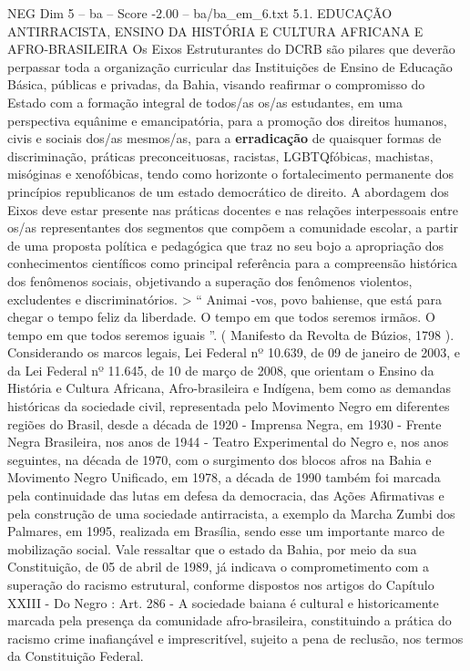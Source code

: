 \begin{textsample}{NEG Dim 5 – ba – Score -2.00 – ba/ba\_em\_6.txt}  \label{ex:f5_neg_011}
5.1.
EDUCAÇÃO ANTIRRACISTA, ENSINO DA HISTÓRIA E CULTURA AFRICANA E AFRO-BRASILEIRA Os Eixos Estruturantes do DCRB são pilares que deverão perpassar toda a organização curricular das Instituições de Ensino de Educação Básica, públicas e privadas, da Bahia, visando reafirmar o compromisso do Estado com a formação integral de todos/as os/as estudantes, em uma perspectiva equânime e emancipatória, para a promoção dos direitos humanos, civis e sociais dos/as mesmos/as, para a \textbf{erradicação} de quaisquer formas de discriminação, práticas preconceituosas, racistas, LGBTQfóbicas, machistas, misóginas e xenofóbicas, tendo como horizonte o fortalecimento permanente dos princípios republicanos de um estado democrático de direito.
A abordagem dos Eixos deve estar presente nas práticas docentes e nas relações interpessoais entre os/as representantes dos segmentos que compõem a comunidade escolar, a partir de uma proposta política e pedagógica que traz no seu bojo a apropriação dos conhecimentos científicos como principal referência para a compreensão histórica dos fenômenos sociais, objetivando a superação dos fenômenos violentos, excludentes e discriminatórios. > “ Animai -vos, povo bahiense, que está para chegar o tempo feliz da liberdade.
O tempo em que todos seremos irmãos.
O tempo em que todos seremos iguais ”. ( Manifesto da Revolta de Búzios, 1798 ).
Considerando os marcos legais, Lei Federal nº 10.639, de 09 de janeiro de 2003, e da Lei Federal nº 11.645, de 10 de março de 2008, que orientam o Ensino da História e Cultura Africana, Afro-brasileira e Indígena, bem como as demandas históricas da sociedade civil, representada pelo Movimento Negro em diferentes regiões do Brasil, desde a década de 1920 - Imprensa Negra, em 1930 - Frente Negra Brasileira, nos anos de 1944 - Teatro Experimental do Negro e, nos anos seguintes, na década de 1970, com o surgimento dos blocos afros na Bahia e Movimento Negro Unificado, em 1978, a década de 1990 também foi marcada pela continuidade das lutas em defesa da democracia, das Ações Afirmativas e pela construção de uma sociedade antirracista, a exemplo da Marcha Zumbi dos Palmares, em 1995, realizada em Brasília, sendo esse um importante marco de mobilização social.
Vale ressaltar que o estado da Bahia, por meio da sua Constituição, de 05 de abril de 1989, já indicava o comprometimento com a superação do racismo estrutural, conforme dispostos nos artigos do Capítulo XXIII - Do Negro : Art. 286 - A sociedade baiana é cultural e historicamente marcada pela presença da comunidade afro-brasileira, constituindo a prática do racismo crime inafiançável e imprescritível, sujeito a pena de reclusão, nos termos da Constituição Federal.

\end{textsample}
